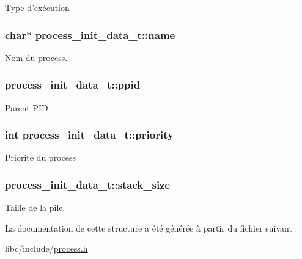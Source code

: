 \-Type d'exécution \hypertarget{structprocess__init__data__t_a6bdcab0bceaafa6e65a236904fb5a157}{
\subsubsection[{name}]{\setlength{\rightskip}{0pt plus 5cm}char$\ast$ {\bf process\-\_\-init\-\_\-data\-\_\-t\-::name}}}\label{structprocess__init__data__t_a6bdcab0bceaafa6e65a236904fb5a157}
\-Nom du process. \hypertarget{structprocess__init__data__t_a34f85f3f56546700b1dc942070944e27}{
\subsubsection[{ppid}]{ {\bf process\-\_\-init\-\_\-data\-\_\-t\-::ppid}}}\label{structprocess__init__data__t_a34f85f3f56546700b1dc942070944e27}
\-Parent \-P\-I\-D \hypertarget{structprocess__init__data__t_a3147915ee1aa09fd84245e28635c60c8}{
\subsubsection[{priority}]{\setlength{\rightskip}{0pt plus 5cm}int {\bf process\-\_\-init\-\_\-data\-\_\-t\-::priority}}}\label{structprocess__init__data__t_a3147915ee1aa09fd84245e28635c60c8}
\-Priorité du process \hypertarget{structprocess__init__data__t_a8a9c2d2d0d602f8e2f3dc2f4c425da29}{
\subsubsection[{stack\-\_\-size}]{ {\bf process\-\_\-init\-\_\-data\-\_\-t\-::stack\-\_\-size}}}\label{structprocess__init__data__t_a8a9c2d2d0d602f8e2f3dc2f4c425da29}
\-Taille de la pile. 

\-La documentation de cette structure a été générée à partir du fichier suivant \-:\begin{DoxyCompactItemize}
\item 
libc/include/\hyperlink{process_8h}{process.\-h}\end{DoxyCompactItemize}
